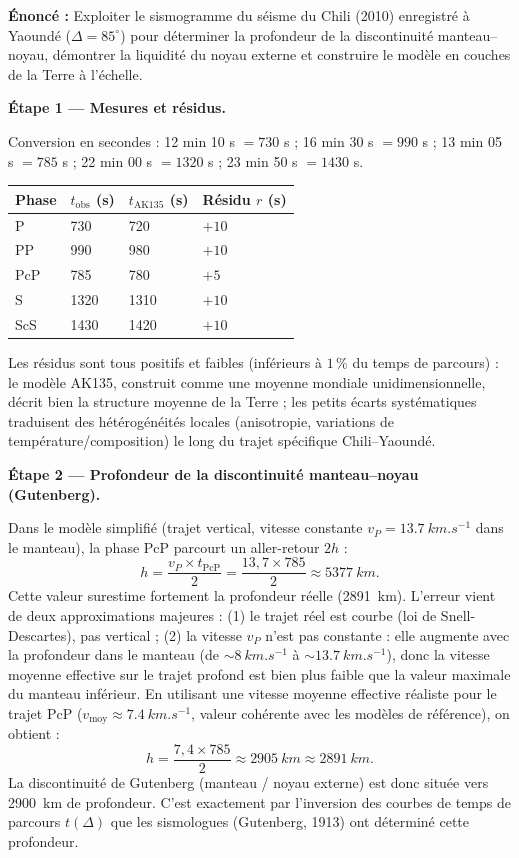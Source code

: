 \documentclass[11pt]{article}
\begin{document}
\begin{exoresolu}
\textbf{Énoncé :} Exploiter le sismogramme du séisme du Chili (2010) enregistré à Yaoundé ($\Delta = 85^\circ$) pour déterminer la profondeur de la discontinuité manteau--noyau, démontrer la liquidité du noyau externe et construire le modèle en couches de la Terre à l'échelle.

\tcblower

\textbf{Étape 1 — Mesures et résidus.}

Conversion en secondes : 
12 min 10 s $= 730$ s ; 
16 min 30 s $= 990$ s ; 
13 min 05 s $= 785$ s ; 
22 min 00 s $= 1320$ s ; 
23 min 50 s $= 1430$ s.

\begin{center}
\begin{tabularx}{\linewidth}{|l|X|X|X|}
\hline
\rowcolor{popblueL} \textbf{Phase} & $t_{\text{obs}}$ (s) & $t_{\text{AK135}}$ (s) & Résidu $r$ (s) \\
\hline
P & 730 & 720 & $+10$ \\
\hline
PP & 990 & 980 & $+10$ \\
\hline
PcP & 785 & 780 & $+5$ \\
\hline
S & 1320 & 1310 & $+10$ \\
\hline
ScS & 1430 & 1420 & $+10$ \\
\hline
\end{tabularx}
\end{center}

Les résidus sont tous positifs et faibles (inférieurs à $1\,\%$ du temps de parcours) : le modèle AK135, construit comme une moyenne mondiale unidimensionnelle, décrit bien la structure moyenne de la Terre ; les petits écarts systématiques traduisent des hétérogénéités locales (anisotropie, variations de température/composition) le long du trajet spécifique Chili--Yaoundé.

\textbf{Étape 2 — Profondeur de la discontinuité manteau--noyau (Gutenberg).}

Dans le modèle simplifié (trajet vertical, vitesse constante $v_P = \SI{13,7}{km.s^{-1}}$ dans le manteau), la phase PcP parcourt un aller-retour $2h$ :
\[ h = \frac{v_P \times t_{\text{PcP}}}{2} = \frac{13{,}7 \times 785}{2} \approx \SI{5377}{km}. \]
Cette valeur surestime fortement la profondeur réelle (\SI{2891}{km}). L'erreur vient de deux approximations majeures : (1) le trajet réel est courbe (loi de Snell-Descartes), pas vertical ; (2) la vitesse $v_P$ n'est pas constante : elle augmente avec la profondeur dans le manteau (de $\sim \SI{8}{km.s^{-1}}$ à $\sim \SI{13,7}{km.s^{-1}}$), donc la vitesse moyenne effective sur le trajet profond est bien plus faible que la valeur maximale du manteau inférieur. En utilisant une vitesse moyenne effective réaliste pour le trajet PcP ($v_{\text{moy}} \approx \SI{7,4}{km.s^{-1}}$, valeur cohérente avec les modèles de référence), on obtient :
\[ h = \frac{7{,}4 \times 785}{2} \approx \SI{2905}{km} \approx \SI{2891}{km}. \]
La discontinuité de Gutenberg (manteau / noyau externe) est donc située vers \SI{2900}{km} de profondeur. C'est exactement par l'inversion des courbes de temps de parcours $t(\Delta)$ que les sismologues (Gutenberg, 1913) ont déterminé cette profondeur.


\end{exoresolu}
\end{document}
